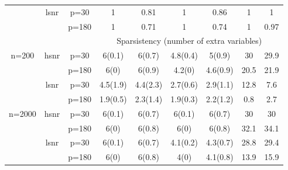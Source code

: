 \begin{table}[ht]
{\begin{tabular}{|c|c|c|cc|cc|cc|}
  \cmidrule{2-9} & \multirow{2}[2]{*}{lsnr} & p=30 & 1 & 0.81 & 1 & 0.86 & 1 & 1 \\ 
   &  & p=180 & 1 & 0.71 & 1 & 0.74 & 1 & 0.97 \\ 
   \midrule 
 \multicolumn{1}{|c}{} & \multicolumn{1}{c}{} &       & \multicolumn{6}{c|}{Sparsistency (number of extra variables)} \\
 \midrule 
\multirow{4}[4]{*}{n=200} & \multirow{2}[2]{*}{hsnr} & p=30 & 6(0.1) & 6(0.7) & 4.8(0.4) & 5(0.9) & 30 & 29.9 \\ 
   &  & p=180 & 6(0) & 6(0.9) & 4.2(0) & 4.6(0.9) & 20.5 & 21.9 \\ 
  \cmidrule{2-9} & \multirow{2}[2]{*}{lsnr} & p=30 & 4.5(1.9) & 4.4(2.3) & 2.7(0.6) & 2.9(1.1) & 12.8 & 7.6 \\ 
   &  & p=180 & 1.9(0.5) & 2.3(1.4) & 1.9(0.3) & 2.2(1.2) & 0.8 & 2.7 \\ 
  \midrule \multirow{4}[4]{*}{n=2000} & \multirow{2}[2]{*}{hsnr} & p=30 & 6(0.1) & 6(0.7) & 6(0.1) & 6(0.7) & 30 & 30 \\ 
   &  & p=180 & 6(0) & 6(0.8) & 6(0) & 6(0.8) & 32.1 & 34.1 \\ 
  \cmidrule{2-9} & \multirow{2}[2]{*}{lsnr} & p=30 & 6(0.1) & 6(0.7) & 4.1(0.2) & 4.3(0.7) & 28.8 & 29.4 \\ 
   &  & p=180 & 6(0) & 6(0.8) & 4(0) & 4.1(0.8) & 13.9 & 15.9 \\ 
   \bottomrule 
\end{tabular}
}
\end{table}
